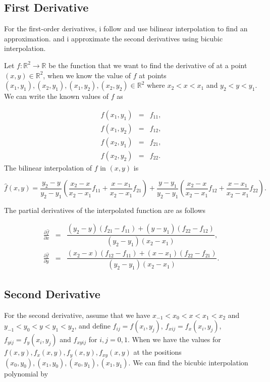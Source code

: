 \subsection{First Derivative}
\label{subsec: gradient estimation}
 For the first-order derivatives, i follow \parencite{michelot_langevin_2019} and use bilinear interpolation to find an approximation. and i approximate the second derivatives using bicubic interpolation. 



Let $f:\mathbb{R}^2\rightarrow \mathbb{R}$ be the function that we want to find the derivative of at a point $(x,y) \in \mathbb{R}^2$, when we know the value of $f$ at points $(x_1, y_1), (x_2, y_1), (x_1, y_2), (x_2, y_2) \in \mathbb{R}^2$ where $x_2 < x < x_1$ and $y_2 < y < y_1$. We can write the known values of $f$ as 


$$
\begin{array}{lcl}
     f(x_1, y_1)& = & f_{11},  \\
     f(x_1, y_2)& = & f_{12},  \\
     f(x_2, y_1)& = & f_{21},  \\
     f(x_2, y_2)& = & f_{22}.  
\end{array}
$$
The bilinear interpolation of $f$ in $(x,y)$ is  

$$
\hat{f}(x,y) = \frac{y_2-y}{y_2-y_1}(\frac{x_2-x}{x_2-x_1}f_{11} + \frac{x-x_1}{x_2-x_1}f_{21}) + \frac{y-y_1}{y_2-y_1}(\frac{x_2-x}{x_2-x_1}f_{12} + \frac{x-x_1}{x_2-x_1}f_{22}).
$$

The partial derivatives of the interpolated function are as follows

$$
\begin{array}{lcl} 
    \frac{\partial\hat{f}}{\partial x} & = & \dfrac{(y_2-y)(f_{21}-f_{11}) + (y-y_1)(f_{22}- f_{12})}{(y_2-y_1)(x_2-x_1)}, \\
    \frac{\partial\hat{f}}{\partial y} & = & \dfrac{(x_2-x)(f_{12}-f_{11}) + (x-x_1)(f_{22}-f_{21})}{(y_2-y_1)(x_2-x_1)}.
\end{array}
$$

\subsection{Second Derivative}
\label{subsec: second derivative}
For the second derivative, assume that we have $x_{-1} < x_0 < x < x_1 < x_2$ and $y_{-1} < y_0 < y < y_1 < y_2$, and define $f_{ij} = f(x_i, y_j)$, $f_{xij} = f_x(x_i,y_j)$, $f_{yij} = f_y(x_i,y_j)$ and $f_{xyij}$ for $i,j = 0, 1$. When we have the values for $f(x,y), f_x(x,y), f_y(x,y), f_{xy}(x,y)$ at the positions $(x_0, y_0), (x_1, y_0), (x_0, y_1), (x_1, y_1)$. We can find the bicubic interpolation polynomial by

